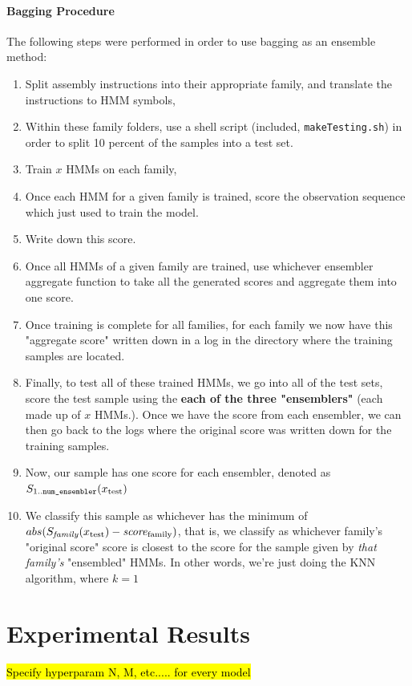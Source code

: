 \documentclass[12pt]{article}
\begin{document}
\subsection{Bagging Procedure}
  The following steps were performed in order to use bagging as an ensemble method:
  \begin{enumerate}
    \item Split assembly instructions into their appropriate family, and translate the instructions to HMM symbols,
    \item Within these family folders, use a shell script (included, \texttt{makeTesting.sh}) in order to split 10 percent of the samples into a test set.
    \item Train $x$ HMMs on each family,
    \item Once each HMM for a given family is trained, score the observation sequence which just used to train the model.
    \item Write down this score. 
    \item Once all HMMs of a given family are trained, use whichever ensembler aggregate function to take all the generated scores and aggregate them into one score. 
    \item Once training is complete for all families, for each family we now have this "aggregate score" written down in a log in the directory where the training samples are located.
    \item Finally, to test all of these trained HMMs, we go into all of the test sets, score the test sample using the \textbf{each of the three "ensemblers"} (each made up of $x$ HMMs.). Once we have the score from each ensembler, we can then go back to the logs where the original score was written down for the training samples. 
    \item Now, our sample has one score for each ensembler, denoted as $S_{1..\text{\texttt{num\_ensembler}}}(x_{\text{test}})$
    \item We classify this sample as whichever has the minimum of $abs(S_{\text{\textit{family}}}(x_{\text{test}}) - \text{\textit{score}}_\text{family} )$, that is, we classify as whichever family's "original score" score is closest to the score for the sample given by \textit{that family's} "ensembled" HMMs. In other words, we're just doing the KNN algorithm, where $k = 1$
  \end{enumerate}


\newpage
\part{Experimental Results}
\hl{Specify hyperparam N, M, etc..... for every model}
\end{document}
